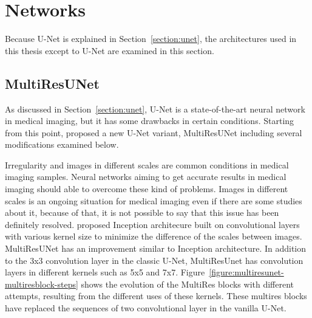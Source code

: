 \section{Networks}\label{section:networks}

    Because U-Net is explained in Section~\ref{section:unet}, the architectures used in this thesis except to U-Net are examined in this section.

    \subsection{MultiResUNet}\label{section:multiresunet}

        As discussed in Section~\ref{section:unet}, U-Net is a state-of-the-art neural network in medical imaging, but it has some drawbacks in certain conditions.
        Starting from this point, \citet{ibtehaz2020multiresunet} proposed a new U-Net variant, MultiResUNet including several modifications examined below.

        

        Irregularity and images in different scales are common conditions in medical imaging samples.
        Neural networks aiming to get accurate results in medical imaging should able to overcome these kind of problems.
        Images in different scales is an ongoing situation for medical imaging even if there are some studies about it, because of that, it is not possible to say that this issue has been definitely resolved.
        \citet{szegedy2015going} proposed Inception architecure built on convolutional layers with various kernel size to minimize the difference of the scales between images.
        MultiResUNet has an improvement similar to Inception architecture.
        In addition to the 3x3 convolution layer in the classic U-Net, MultiResUnet has convolution layers in different kernels such as 5x5 and 7x7.
        Figure~\ref{figure:multiresunet-multiresblock-steps} shows the evolution of the MultiRes blocks with different attempts, resulting from the different uses of these kernels.
        These multires blocks have replaced the sequences of two convolutional layer in the vanilla U-Net.

        

